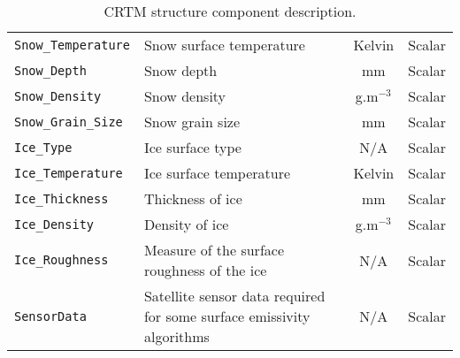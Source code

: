 \begin{table}[htp]
\begin{tabular}{l p{7cm} c c}
    \texttt{Snow\_Temperature} & Snow surface temperature & Kelvin & Scalar \\ 
    \texttt{Snow\_Depth}       & Snow depth & mm & Scalar \\ 
    \texttt{Snow\_Density}     & Snow density & g.m$^{-3}$ & Scalar \\ 
    \texttt{Snow\_Grain\_Size} & Snow grain size & mm & Scalar \\ 
    \hline
    \texttt{Ice\_Type}        & Ice surface type & N/A & Scalar \\ 
    \texttt{Ice\_Temperature} & Ice surface temperature & Kelvin & Scalar \\ 
    \texttt{Ice\_Thickness}   & Thickness of ice & mm & Scalar \\ 
    \texttt{Ice\_Density}     & Density of ice & g.m$^{-3}$ & Scalar \\ 
    \texttt{Ice\_Roughness}   & Measure of the surface roughness of the ice & N/A & Scalar \\ 
    \hline
    \texttt{SensorData} & Satellite sensor data required for some surface emissivity algorithms & N/A & Scalar \\ 
    \hline
  \end{tabular}
  \caption{CRTM \Surface{} structure component description.}
  \label{tab:surface_structure}
\end{table}

